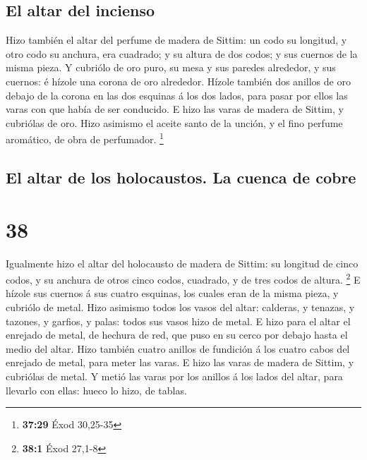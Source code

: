 \hypertarget{el-altar-del-incienso}{%
\subsection{El altar del incienso}\label{el-altar-del-incienso}}

 Hizo también el altar del perfume de madera de Sittim: un
codo su longitud, y otro codo su anchura, era cuadrado; y su altura de
dos codos; y sus cuernos de la misma pieza.  Y cubriólo de
oro puro, su mesa y sus paredes alrededor, y sus cuernos: é hízole una
corona de oro alrededor.  Hízole también dos anillos de oro
debajo de la corona en las dos esquinas á los dos lados, para pasar por
ellos las varas con que había de ser conducido.  E hizo las
varas de madera de Sittim, y cubriólas de oro.  Hizo
asimismo el aceite santo de la unción, y el fino perfume aromático, de
obra de perfumador. \footnote{\textbf{37:29} Éxod 30,25-35}

\hypertarget{el-altar-de-los-holocaustos.-la-cuenca-de-cobre}{%
\subsection{El altar de los holocaustos. La cuenca de
cobre}\label{el-altar-de-los-holocaustos.-la-cuenca-de-cobre}}

\hypertarget{section-37}{%
\section{38}\label{section-37}}

 Igualmente hizo el altar del holocausto de madera de
Sittim: su longitud de cinco codos, y su anchura de otros cinco codos,
cuadrado, y de tres codos de altura. \footnote{\textbf{38:1} Éxod 27,1-8}
 E hízole sus cuernos á sus cuatro esquinas, los cuales eran
de la misma pieza, y cubriólo de metal.  Hizo asimismo todos
los vasos del altar: calderas, y tenazas, y tazones, y garfios, y palas:
todos sus vasos hizo de metal.  E hizo para el altar el
enrejado de metal, de hechura de red, que puso en su cerco por debajo
hasta el medio del altar.  Hizo también cuatro anillos de
fundición á los cuatro cabos del enrejado de metal, para meter las
varas.  E hizo las varas de madera de Sittim, y cubriólas de
metal.  Y metió las varas por los anillos á los lados del
altar, para llevarlo con ellas: hueco lo hizo, de tablas.

